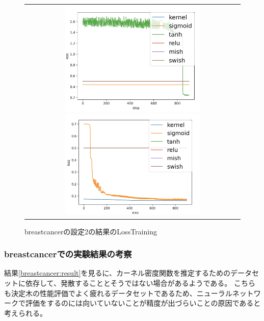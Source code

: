 \begin{figure}[hbtp]
    \begin{center}
        \begin{tabular}{c}
            \begin{minipage}{0.5\hsize}
                \includegraphics[clip, width=7cm]{asset/breastcancer_0.001_1000_3_005_sgd_non_kaiming_uniform}
                    \caption{breastcancerの設定1の結果のLossTraining}
                    \label{breastcancer_1}
            \end{minipage}
            \hspace{10pt}
            \begin{minipage}{0.5\hsize}
                \includegraphics[clip, width=7cm]{asset/breastcancer_0.001_1000_3_05_sgd_non_kaiming_uniform}
                    \caption{breastcancerの設定2の結果のLossTraining}
                    \label{breastcancer_2}
            \end{minipage}
        \end{tabular}
    \end{center}
\end{figure}


\subsubsection{breastcancerでの実験結果の考察}
結果\ref{breastcancer:result}を見るに、カーネル密度関数を推定するためのデータセットに依存して、発散することとそうではない場合があるようである。
こちらも決定木の性能評価でよく疲れるデータセットであるため、ニューラルネットワークで評価をするのには向いていないことが精度が出づらいことの原因であると考えられる。


